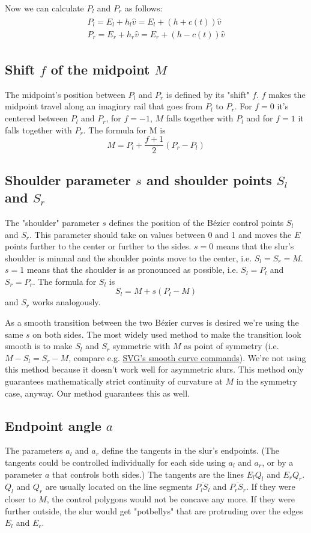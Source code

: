 \documentclass{article}
\begin{document}
Now we can calculate $P_l$ and $P_r$ as follows:
\begin{eqnarray}\begin{matrix}
P_l=E_l+h_l\hat v=E_l+(h+c(t))\hat v\\
P_r=E_r+h_r\hat v=E_r+(h-c(t))\hat v
\end{matrix}\end{eqnarray}

\subsection{Shift $f$ of the midpoint $M$}
The midpoint's position between $P_l$ and $P_r$ is defined by its "shift" $f$.
$f$ makes the midpoint travel along an imaginry rail that goes from $P_l$ to $P_r$.
For $f=0$ it's centered between $P_l$ and $P_r$, 
for $f=-1$, $M$ falls together with $P_l$ and for $f=1$ it falls together with $P_r$.
The formula for M is
$$M=P_l+\frac{f+1}{2}(P_r - P_l)$$

\subsection{Shoulder parameter $s$ and shoulder points $S_l$ and $S_r$}
The "shoulder" parameter $s$ defines the position of the Bézier control points $S_l$ and $S_r$.
This parameter should take on values between 0 and 1 and moves the $E$ points 
further to the center or further to the sides.
$s=0$ means that the slur's shoulder is minmal and the shoulder points move to the center,
i.e. $S_l = S_r = M$.
$s=1$ means that the shoulder is as pronounced as possible, i.e. $S_l=P_l$ and $S_r=P_r$.
The formula for $S_l$ is
$$S_l=M+s(P_l-M) $$
and $S_r$ works analogously.

As a smooth transition between the two Bézier curves is desired we're using the same $s$ on both sides.
The most widely used method to make the transition look smooth is to make $S_l$ and $S_r$ symmetric with 
$M$ as point of symmetry (i.e. $M - S_l = S_r - M$, compare e.g.
\href{http://www.w3.org/TR/SVG/paths.html#PathDataCubicBezierCommands}{SVG's smooth curve commands}).
We're not using this method because it doesn't work well for asymmetric slurs.
This method only guarantees mathematically strict continuity of curvature at $M$ 
in the symmetry case, anyway. Our method guarantees this as well.

\subsection{Endpoint angle $a$}
The parameters $a_l$ and $a_r$ define the tangents in the slur's endpoints.
(The tangents could be controlled individually for each side using $a_l$ and $a_r$,
or by a parameter $a$ that controls both sides.)
The tangents are the lines $E_l Q_l$ and $E_r Q_r$.
$Q_l$ and $Q_r$ are usually located on the line segments $\overline{P_l S_l}$ and $\overline{P_r S_r}$.
If they were closer to $M$, the control polygons would not be concave any more. If they were further outside, the slur would get
"potbellys" that are protruding over the edges $E_l$ and $E_r$.
\end{document}
